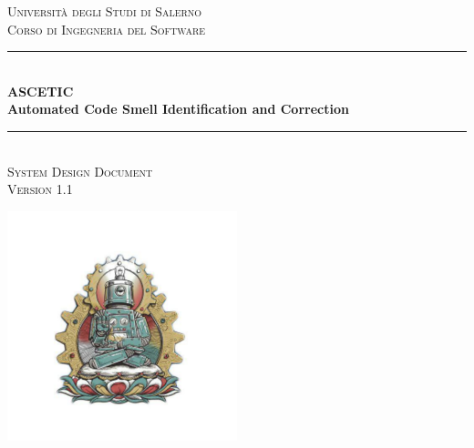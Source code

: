 \documentclass[11pt]{article}
\newcommand{\doctitle}{System Design Document}
\begin{document}
	
	
	\begin{titlepage} %
		\newcommand{\HRule}{\rule{\linewidth}{0.5mm}} %
		
		\center %
		
		
		\textsc{\LARGE Università degli Studi di Salerno}\\
		\textsc{\large Corso di Ingegneria del Software}\\[1.5cm] %
		
		
		\HRule\\[0.4cm]
		
		{\huge\bfseries ASCETIC}\\ %
		\vspace{0.2cm}
		{\large\bfseries Automated Code Smell Identification and Correction}\\[0.2cm] %
		
		\HRule\\[1.5cm]
		
		\textsc{\Large \doctitle}\\[0.3cm] %
		
		\textsc{\large Version 1.1}\\[0.5cm] %
		
		
		
		\vfill\vfill
		
		\includegraphics[width=0.5\textwidth]{Various/ascetic_logo.jpg}\\[1cm] %
		

\end{titlepage}
\end{document}
